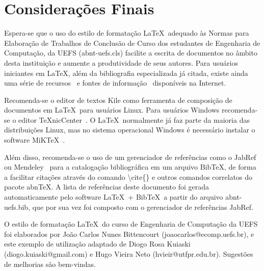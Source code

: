 \chapter{Considerações Finais}
\label{chap:conclusao}
Espera-se que o uso do estilo de formata\c{c}\~ao \LaTeX\ adequado \`as Normas para Elabora\c{c}\~ao de Trabalhos de Conclusão de Curso dos estudantes de Engenharia de Computação, da UEFS ({\ttfamily abnt-uefs.cls}) facilite a escrita de documentos no \^ambito desta institui\c{c}\~ao e aumente a produtividade de seus autores. Para usu\'arios iniciantes em \LaTeX, al\'em da bibliografia especializada j\'a citada, existe ainda uma s\'erie de recursos~\cite{CTAN2009} e fontes de informa\c{c}\~ao~\cite{TeX-Br2009,Wikibooks2009} dispon\'iveis na Internet.

Recomenda-se o editor de textos Kile como ferramenta de composi\c{c}\~ao de documentos em \LaTeX\ para usu\'arios Linux. Para usu\'arios Windows recomenda-se o editor \TeX nicCenter~\cite{TeXnicCenter2009}. O \LaTeX\ normalmente j\'a faz parte da maioria das distribui\c{c}\~oes Linux, mas no sistema operacional Windows \'e necess\'ario instalar o software MiK\TeX~\cite{MiKTeX2009}.

Al\'em disso, recomenda-se o uso de um gerenciador de refer\^encias como o JabRef~\cite{JabRef2009} ou Mendeley~\cite{Mendeley2009} para a cataloga\c{c}\~ao bibliogr\'afica em um arquivo Bib\TeX, de forma a facilitar cita\c{c}\~oes atrav\'es do comando {\ttfamily \textbackslash cite\{\}} e outros comandos correlatos do pacote abn\TeX. A lista de refer\^encias deste documento foi gerada automaticamente pelo software \LaTeX\ + Bib\TeX\ a partir do arquivo {\ttfamily abnt-uefs.bib}, que por sua vez foi composto com o gerenciador de refer\^encias JabRef.

O estilo de formata\c{c}\~ao \LaTeX\ do curso de Engenharia de Computação da UEFS foi elaborados por João Carlos Nunes Bittencourt (joaocarlos@ecomp.uefs.br), e este exemplo de utiliza\c{c}\~ao adaptado de Diogo Rosa Kuiaski (diogo.kuiaski@gmail.com) e Hugo Vieira Neto (hvieir@utfpr.edu.br). Sugest\~oes de melhorias s\~ao bem-vindas.
